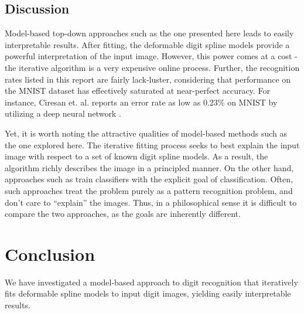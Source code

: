 \documentclass[oribibl]{llncs}
\begin{document}
\subsection{Discussion}

Model-based top-down approaches such as the one presented here leads to easily interpretable results.
After fitting, the deformable digit spline models provide a powerful interpretation of the input image.
However, this power comes at a cost - the iterative algorithm is a very expensive online process.
Further, the recognition rates listed in this report are fairly lack-luster, considering that performance on the MNIST dataset has effectively saturated at near-perfect accuracy.
For instance, Ciresan et. al. reports an error rate as low as 0.23\% on MNIST by utilizing a deep neural network \cite{ciresan}.

Yet, it is worth noting the attractive qualities of model-based methods such as the one explored here.  
The iterative fitting process seeks to best explain the input image with respect to a set of known digit spline models.
As a result, the algorithm richly describes the image in a principled manner.
On the other hand, approaches such as \cite{ciresan} train classifiers with the explicit goal of classification.
Often, such approaches treat the problem purely as a pattern recognition problem, and don't care to ``explain'' the images.
Thus, in a philosophical sense it is difficult to compare the two approaches, as the goals are inherently different.

\section{Conclusion}

We have investigated a model-based approach to digit recognition that iteratively fits deformable spline models to input digit images, yielding easily interpretable results.


 

\end{document}
